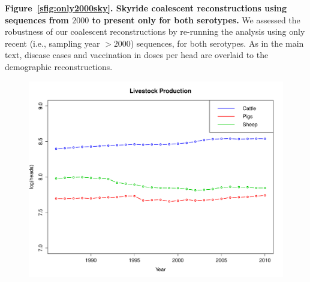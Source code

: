 \documentclass[a4paper,10pt]{article}
\begin{document}
\textbf{Figure~\ref{sfig:only2000sky}. Skyride coalescent reconstructions using sequences from $2000$ to present only for both serotypes.}
We assessed the robustness of our coalescent reconstructions by re-running the analysis using only recent (i.e., sampling year $>2000$) sequences, for both serotypes.
As in the main text, disease cases and vaccination in doses per head are overlaid to the demographic reconstructions.
\newpage
\begin{center}
\begin{figure}[H]
\begin{center}
\includegraphics[scale=.80]{FIGURES/production.pdf}
\end{center}
\caption{}
\label{sfig:prod}
\end{figure}
\end{center}
\newpage
\end{document}
